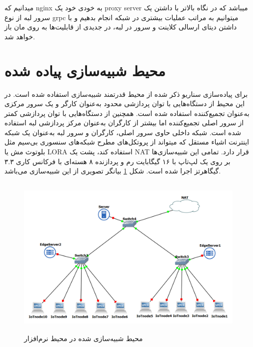 میدانیم که nginx به خودی خود یک proxy server میباشد که در نگاه بالاتر با داشتن یک سرور لبه از نوع grpc میتوانیم به مراتب عملیات بیشتری در شبکه انجام بدهیم و با داشتن دیتای ارسالی کلاینت و سرور در لبه، در جدیدی از  قابلیت‌ها به روی مان باز خواهد شد.

\section{محیط شبیه‌سازی پیاده شده}

برای پیاده‌سازی سناریو ذکر شده از محیط قدرتمند شبیه‌سازی  استفاده شده است. در این محیط از دستگاه‌هایی با توان پردازشی محدود به‌عنوان کارگر و یک سرور مرکزی به‌عنوان تجمیع‌کننده استفاده شده است. همچنین از دستگاه‌هایی با توان پردازشی کمتر از سرور اصلی تجمیع‌کننده اما بیشتر از کارگران به‌عنوان مرکز پردازشی لبه استفاده شده است. شبکه داخلی حاوی سرور اصلی، کارگران و سرور لبه به‌عنوان یک شبکه اینترنت اشیاء مستقل که میتواند از پروتکل‌های مطرح شبکه‌های سنسوری بی‌سیم مثل بلوتوث مش یا LORA استفاده کند، پشت یک NAT قرار دارد. تمامی این شبیه‌سازی‌ها بر روی یک لپ‌تاپ با ۱۶ گیگابایت رم و پردازنده ۸ هسته‌ای  با فرکانس کاری ۳.۳ گیگاهرتز اجرا شده است. شکل \ref{scheme} بیانگر تصویری از این شبیه‌سازی می‌باشد.

\begin{figure}[H]
    \centering
   \includegraphics[height=8cm,width=14cm]{./GNS3/scheme.png}
   \caption{ محیط شبیه‌سازی شده در محیط نرم‌افزار }
   \label{scheme}
   \centering
\end{figure}

